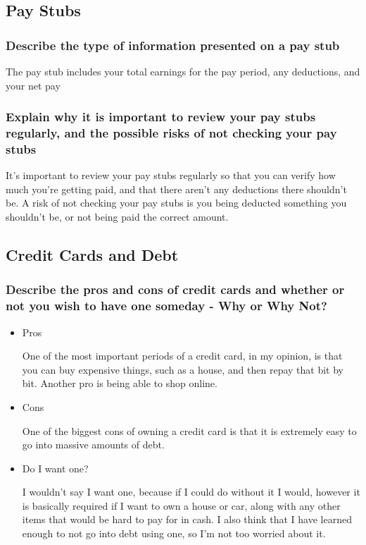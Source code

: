 \documentclass[11pt]{article}
\begin{document}
\subsection*{Pay Stubs}
\label{sec:org31b6315}
\subsubsection*{Describe the type of information presented on a pay stub}
\label{sec:org0890f3c}

The pay stub includes your total earnings for the pay period, any deductions, and your net pay

\subsubsection*{Explain why it is important to review your pay stubs regularly, and the possible risks of not checking your pay stubs}
\label{sec:orgbcd775c}

It's important to review your pay stubs regularly so that you can verify how much you're getting paid, and that there aren't any deductions there shouldn't be. A risk of not checking your pay stubs is you being deducted something you shouldn't be, or not being paid the correct amount. 

\subsection*{Credit Cards and Debt}
\label{sec:orgeeb17e8}
\subsubsection*{Describe the pros and cons of credit cards and whether or not you wish to have one someday - Why or Why Not?}
\label{sec:org829bafd}
\begin{itemize}
\item Pros
\label{sec:org5436cb4}

One of the most important periods of a credit card, in my opinion, is that you can buy expensive things, such as a house, and then repay that bit by bit. Another pro is being able to shop online.

\item Cons
\label{sec:orgdad8d14}

One of the biggest cons of owning a credit card is that it is extremely easy to go into massive amounts of debt. 

\item Do I want one?
\label{sec:org6cea920}

I wouldn't say I want one, because if I could do without it I would, however it is basically required if I want to own a house or car, along with any other items that would be hard to pay for in cash. I also think that I have learned enough to not go into debt using one, so I'm not too worried about it.
\end{itemize}
\end{document}
